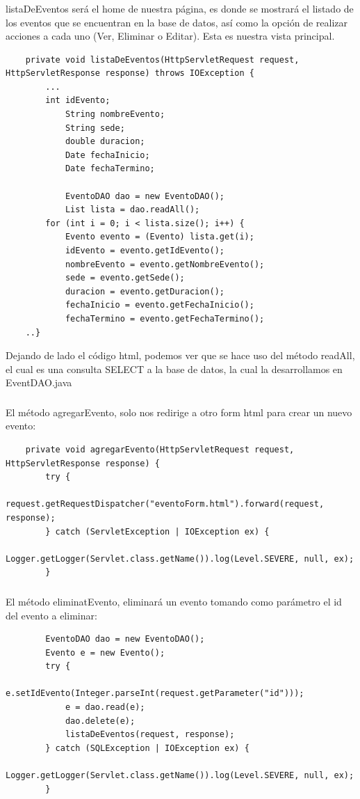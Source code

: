 \documentclass[10pt,a4paper]{article}
\begin{document}
    \subsubsection{\color{colorIPN}{listaDeEventos}}
    listaDeEventos será el home de nuestra página, es donde se mostrará el listado de los eventos que se encuentran en la base de datos, así como la opción de realizar acciones a cada uno (Ver, Eliminar o Editar). Esta es nuestra vista principal.
    \begin{lstlisting}
    private void listaDeEventos(HttpServletRequest request, HttpServletResponse response) throws IOException {
        ...
        int idEvento;
            String nombreEvento;
            String sede;
            double duracion;
            Date fechaInicio;
            Date fechaTermino;
        
            EventoDAO dao = new EventoDAO();
            List lista = dao.readAll();
        for (int i = 0; i < lista.size(); i++) {
            Evento evento = (Evento) lista.get(i);
            idEvento = evento.getIdEvento();
            nombreEvento = evento.getNombreEvento();
            sede = evento.getSede();
            duracion = evento.getDuracion();
            fechaInicio = evento.getFechaInicio();
            fechaTermino = evento.getFechaTermino();
    ..}
    \end{lstlisting}
    Dejando de lado el código html, podemos ver que se hace uso del método readAll, el cual es una consulta SELECT a la base de datos, la cual la desarrollamos en EventDAO.java
    \subsubsection{\color{colorIPN}{agregarEvento}}
    El método agregarEvento, solo nos redirige a otro form html para crear un nuevo evento:
    \begin{lstlisting}
    private void agregarEvento(HttpServletRequest request, HttpServletResponse response) {
        try {
            request.getRequestDispatcher("eventoForm.html").forward(request, response);
        } catch (ServletException | IOException ex) {
            Logger.getLogger(Servlet.class.getName()).log(Level.SEVERE, null, ex);
        }
    \end{lstlisting}
    \subsubsection{\color{colorIPN}{eliminarEvento}}
    El método eliminatEvento, eliminará un evento tomando como parámetro el id del evento a eliminar:
    \begin{lstlisting}
        EventoDAO dao = new EventoDAO();
        Evento e = new Evento();
        try {
            e.setIdEvento(Integer.parseInt(request.getParameter("id")));
            e = dao.read(e);
            dao.delete(e);
            listaDeEventos(request, response);
        } catch (SQLException | IOException ex) {
            Logger.getLogger(Servlet.class.getName()).log(Level.SEVERE, null, ex);
        }
    \end{lstlisting}
\end{document}
